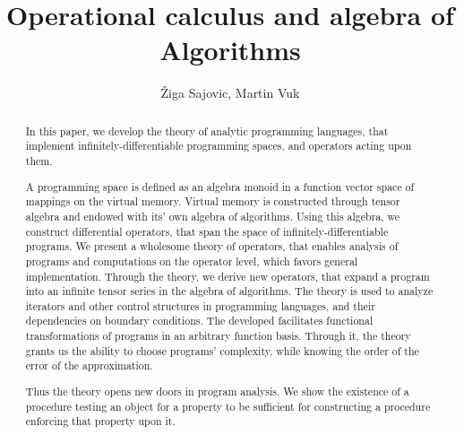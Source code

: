 \documentclass{article}
\title{Operational calculus and algebra of Algorithms}
\author{Žiga Sajovic, Martin Vuk}
\begin{document}
\maketitle
\begin{abstract}
In this paper, we develop the theory of analytic programming languages, that implement infinitely-differentiable programming spaces, and operators acting upon them.

A programming space is defined as an algebra monoid in a function vector space of mappings on the virtual memory. Virtual memory is constructed through tensor algebra and endowed with its' own algebra of algorithms. Using this algebra, we construct differential operators, that span the space of infinitely-differentiable programs. We present a wholesome theory of operators, that enables analysis of programs and computations on the operator level, which favors general implementation. Through the theory, we derive new operators, that expand a program into an infinite tensor series in the algebra of algorithms. The theory is used to analyze iterators and other control structures in programming languages, and their dependencies on boundary conditions. The developed facilitates functional transformations of programs in an arbitrary function basis. Through it, the theory grants us the ability to choose programs' complexity, while knowing the order of the error of the approximation.

Thus the theory opens new doors in program analysis. We show the existence of a procedure testing an object for a property to be sufficient for constructing a procedure enforcing that property upon it.
\end{abstract}
\end{document}
